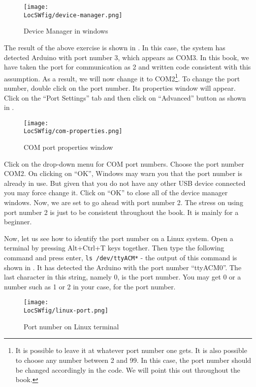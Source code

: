 \begin{figure}
      \centering
      \texttt{[image: \\LocSWfig/device-manager.png]}
      \caption{Device Manager in windows}
      \label{dev-mgr}
\end{figure}

The result of the above exercise is shown in .  In
this case, the system has detected Arduino with port number 3, which
appears as COM3.  In this book, we have taken the port for
communication as 2 and written code consistent with this assumption.    
As a result, we will now change it to
COM2\footnote{\label{fn:port}It is possible to leave it at whatever
      port number one gets.  It is also possible to choose any number
      between 2 and 99.  In this case, the port number should be
      changed accordingly in the code.  We will point this out throughout
      the book.}.  To change the port number, double click on the port
number. Its properties window will appear. Click on the ``Port
Settings'' tab and then click on ``Advanced'' button as shown in
.

\begin{figure}
      \centering
      \texttt{[image: \\LocSWfig/com-properties.png]}
      \caption{COM port properties window}
      \label{com}
\end{figure}

Click on the drop-down menu for COM port numbers. Choose the port
number COM2.  On clicking on ``OK'', Windows may warn you that the port
number is already in use. But given that you do not have any other USB
device connected you may force change it. Click on ``OK'' to close
all of the device manager windows. Now, we are set to go ahead with
port number 2. The stress on using port number 2 is just to be
consistent throughout the book. It is mainly for a beginner.

Now, let us see how to identify the port number on a Linux
system. Open a terminal by pressing Alt+Ctrl+T keys together. Then
type the following command and press enter, {\tt ls
            /dev/ttyACM*} -
the output of this command is shown in . It has
detected the Arduino with the port number ``ttyACM0''.  The last character
in this string, namely 0, is the port number.  You may get 0 or a
number such as 1 or 2 in your case, for the port number.

\begin{figure}
      \centering
      \texttt{[image: \\LocSWfig/linux-port.png]}
      \caption{Port number on Linux terminal}
      \label{linux-port}
\end{figure}

